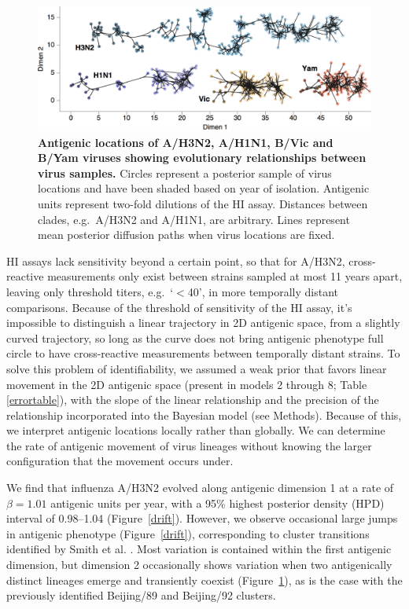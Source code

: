 \documentclass[11pt,oneside,letterpaper]{article}
\begin{document}
\begin{figure}[h]
	\centering		
	\includegraphics[width=1.0\textwidth]{figures/map}
	\caption{\textbf{Antigenic locations of A/H3N2, A/H1N1, B/Vic and B/Yam viruses showing evolutionary relationships between virus samples.} 
	Circles represent a posterior sample of virus locations and have been shaded based on year of isolation.
	Antigenic units represent two-fold dilutions of the HI assay.
	Distances between clades, e.g.\ A/H3N2 and A/H1N1, are arbitrary.
	Lines represent mean posterior diffusion paths when virus locations are fixed.} 
	\label{map} 
\end{figure}

HI assays lack sensitivity beyond a certain point, so that for A/H3N2, cross-reactive measurements only exist between strains sampled at most 11 years apart, leaving only threshold titers, e.g.\ `$<$40', in more temporally distant comparisons.  
Because of the threshold of sensitivity of the HI assay, it's impossible to distinguish a linear trajectory in 2D antigenic space, from a slightly curved trajectory, so long as the curve does not bring antigenic phenotype full circle to have cross-reactive measurements between temporally distant strains.
To solve this problem of identifiability, we assumed a weak prior that favors linear movement in the 2D antigenic space (present in models 2 through 8; Table \ref{errortable}), with the slope of the linear relationship and the precision of the relationship incorporated into the Bayesian model (see Methods).
Because of this, we interpret antigenic locations locally rather than globally.
We can determine the rate of antigenic movement of virus lineages without knowing the larger configuration that the movement occurs under.
 
We find that influenza A/H3N2 evolved along antigenic dimension 1 at a rate of $\beta=1.01$ antigenic units per year, with a 95\% highest posterior density (HPD) interval of 0.98--1.04 (Figure~\ref{drift}).
However, we observe occasional large jumps in antigenic phenotype (Figure~\ref{drift}), corresponding to cluster transitions identified by Smith et al. \cite{Smith04}.  
Most variation is contained within the first antigenic dimension, but dimension 2 occasionally shows variation when two antigenically distinct lineages emerge and transiently coexist (Figure~\ref{map}), as is the case with the previously identified Beijing/89 and Beijing/92 clusters.
\end{document}
